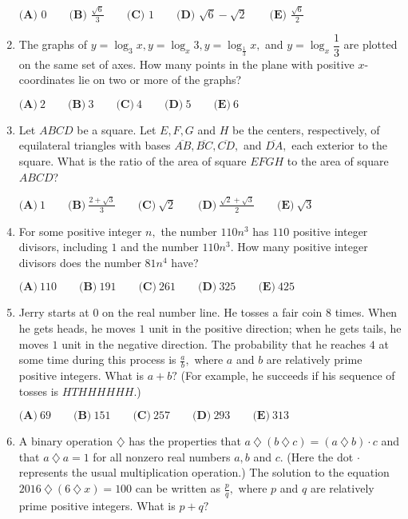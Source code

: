 \documentclass{article}
\begin{document}
\begin{enumerate}[label=\arabic*., itemsep=0.5em]
\(\textbf{(A) } 0\qquad \textbf{(B) } \frac{\sqrt{6}}{3}\qquad\textbf{(C) } 1\qquad\textbf{(D) } \sqrt{6}-\sqrt{2}\qquad\textbf{(E) }\frac{\sqrt{6}}{2}\)\par \vspace{0.5em}\item The graphs of \(y=\log_3 x, y=\log_x 3, y=\log_\frac{1}{3} x,\) and \(y=\log_x \dfrac{1}{3}\) are plotted on the same set of axes. How many points in the plane with positive \(x\)-coordinates lie on two or more of the graphs? 

\(\textbf{(A)}\ 2\qquad\textbf{(B)}\ 3\qquad\textbf{(C)}\ 4\qquad\textbf{(D)}\ 5\qquad\textbf{(E)}\ 6\)\par \vspace{0.5em}\item Let \(ABCD\) be a square. Let \(E, F, G\) and \(H\) be the centers, respectively, of equilateral triangles with bases \(\overline{AB}, \overline{BC}, \overline{CD},\) and \(\overline{DA},\) each exterior to the square. What is the ratio of the area of square \(EFGH\) to the area of square \(ABCD\)? 

\(\textbf{(A)}\ 1\qquad\textbf{(B)}\ \frac{2+\sqrt{3}}{3} \qquad\textbf{(C)}\ \sqrt{2} \qquad\textbf{(D)}\ \frac{\sqrt{2}+\sqrt{3}}{2} \qquad\textbf{(E)}\ \sqrt{3}\)\par \vspace{0.5em}\item For some positive integer \(n,\) the number \(110n^3\) has \(110\) positive integer divisors, including \(1\) and the number \(110n^3.\) How many positive integer divisors does the number \(81n^4\) have? 

\(\textbf{(A)}\ 110\qquad\textbf{(B)}\ 191\qquad\textbf{(C)}\ 261\qquad\textbf{(D)}\ 325\qquad\textbf{(E)}\ 425\)\par \vspace{0.5em}\item Jerry starts at \(0\) on the real number line. He tosses a fair coin \(8\) times. When he gets heads, he moves \(1\) unit in the positive direction; when he gets tails, he moves \(1\) unit in the negative direction. The probability that he reaches \(4\) at some time during this process is \(\frac{a}{b},\) where \(a\) and \(b\) are relatively prime positive integers. What is \(a + b?\) (For example, he succeeds if his sequence of tosses is \(HTHHHHHH.\))

\(\textbf{(A)}\ 69\qquad\textbf{(B)}\ 151\qquad\textbf{(C)}\ 257\qquad\textbf{(D)}\ 293\qquad\textbf{(E)}\ 313\)\par \vspace{0.5em}\item A binary operation \(\diamondsuit \) has the properties that \(a\ \diamondsuit\ (b\ \diamondsuit\ c) = (a\ \diamondsuit\ b)\cdot c\) and that \(a\ \diamondsuit\ a = 1\) for all nonzero real numbers \(a, b\) and \(c.\) (Here the dot  \(\cdot\)  represents the usual multiplication operation.) The solution to the equation \(2016\ \diamondsuit\ (6\ \diamondsuit\ x) = 100\) can be written as \(\frac{p}{q},\) where \(p\) and \(q\) are relatively prime positive integers. What is \(p + q?\) 


\end{enumerate}
\end{document}
